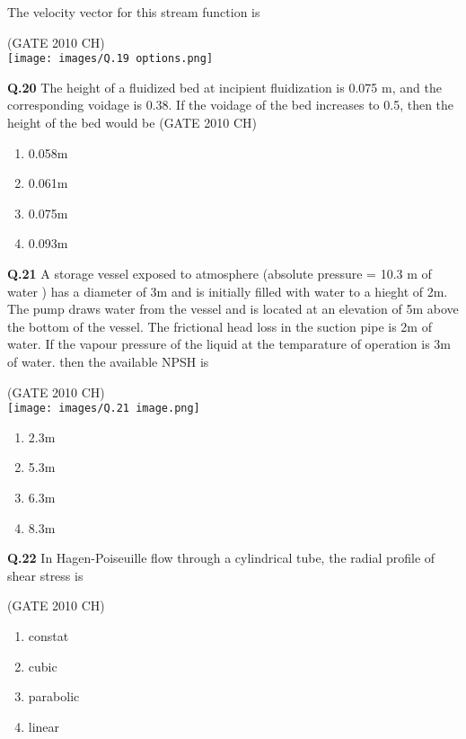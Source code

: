 \documentclass[journal,12pt,onecolumn]{exam}
\theoremstyle{remark}
\begin{document}
   The velocity vector for this stream function is

   \hfill{(GATE 2010 CH)}\\
  \texttt{[image: images/Q.19 options.png]}
      
\noindent
\textbf{Q.20}
   The height of a fluidized bed at incipient fluidization is 0.075 m, and the corresponding voidage is 0.38. If the voidage of the bed increases to 0.5, then the height of the bed would be
\hfill{(GATE 2010 CH)}\\

\begin{enumerate}
    \item 0.058m
    \item 0.061m
    \item 0.075m
    \item 0.093m
\end{enumerate}


\noindent
\textbf{Q.21}
   A storage vessel exposed to atmosphere (absolute pressure = 10.3 m of water ) has a diameter of 3m and is initially filled with water to a hieght of 2m. The pump draws water from the vessel and is located at an elevation of 5m above the bottom of the vessel. The frictional head loss in the suction pipe is 2m of water. If the vapour pressure of the liquid at the temparature of operation is 3m of water. then the available NPSH is

   \hfill{(GATE 2010 CH)}\\
  \texttt{[image: images/Q.21 image.png]}
      
 
  \begin{enumerate}
      \item 2.3m
      \item 5.3m
      \item 6.3m
      \item 8.3m
      
  \end{enumerate}


\noindent
\textbf{Q.22}
 In Hagen-Poiseuille flow through a cylindrical tube, the radial profile of shear stress is
 
 \hfill{(GATE 2010 CH)}\\

\begin{enumerate}
    \item constat
    \item cubic
    \item parabolic
    \item linear
    
\end{enumerate}
\end{document}
